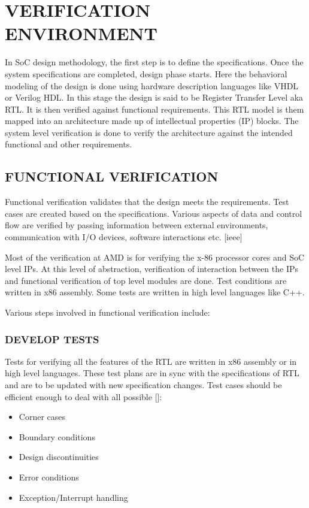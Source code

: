 \chapter{VERIFICATION ENVIRONMENT}
\label{chap:verification.tex}

In SoC design methodology, the first step is to define the specifications. Once the system specifications are completed, design phase starts. Here the behavioral modeling of the design is done using hardware description languages like VHDL or Verilog HDL.  In this  stage the design is said to be Register Transfer Level aka RTL. It is then verified against functional requirements.  This RTL model is them mapped into an architecture made up of intellectual properties (IP) blocks. The system level verification is done to verify the architecture against the intended functional and other requirements. 



\section {FUNCTIONAL VERIFICATION}
Functional verification validates that the design meets the requirements. Test cases are created based on the specifications. Various aspects of data and control flow are verified by passing information between external environments, communication with I/O devices,  software interactions etc. [ieee]

 


Most of the verification at AMD is for verifying the x-86 processor cores and SoC level IPs. At this level of abstraction, verification of interaction between the IPs and functional verification of top level modules are done.  Test conditions are written in x86 assembly. Some tests are written in high level languages like C++.

Various steps involved in functional verification include:




\subsection {DEVELOP TESTS}

Tests for verifying all the features of the RTL are written in x86 assembly or in high level languages. These test plans are in sync with the specifications of RTL and are to be updated with new specification changes. Test cases should be efficient enough to deal with all possible []: 
\begin{itemize}

\item Corner cases
\item Boundary conditions
\item Design discontinuities
\item Error conditions
\item Exception/Interrupt handling

\end {itemize}

